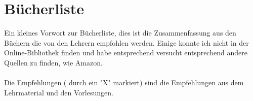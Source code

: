 \chapter{Bücherliste}

Ein kleines Vorwort zur Bücherliste, dies ist die Zusammenfassung aus den Büchern die von den Lehrern empfohlen werden. Einige konnte ich nicht in der Online-Bibliothek finden und habe entsprechend versucht entsprechend andere Quellen zu finden, wie Amazon. \\~\\
Die Empfehlungen ( durch ein "X" markiert) sind die Empfehlungen aus dem Lehrmaterial und den Vorlesungen.

